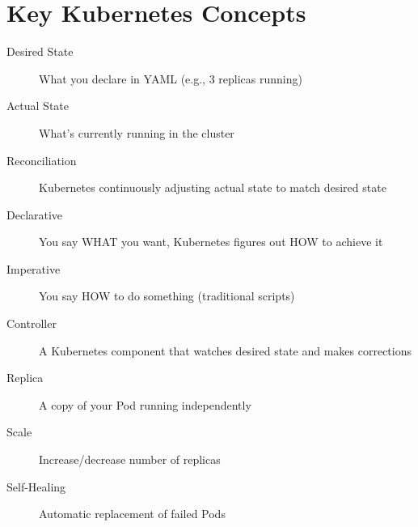 \documentclass[12pt,a4paper]{article}
\begin{document}
\section{Key Kubernetes Concepts}

\begin{description}
    \item[Desired State] What you declare in YAML (e.g., 3 replicas running)
    \item[Actual State] What's currently running in the cluster
    \item[Reconciliation] Kubernetes continuously adjusting actual state to match desired state
    \item[Declarative] You say WHAT you want, Kubernetes figures out HOW to achieve it
    \item[Imperative] You say HOW to do something (traditional scripts)
    \item[Controller] A Kubernetes component that watches desired state and makes corrections
    \item[Replica] A copy of your Pod running independently
    \item[Scale] Increase/decrease number of replicas
    \item[Self-Healing] Automatic replacement of failed Pods
\end{description}
\end{document}
